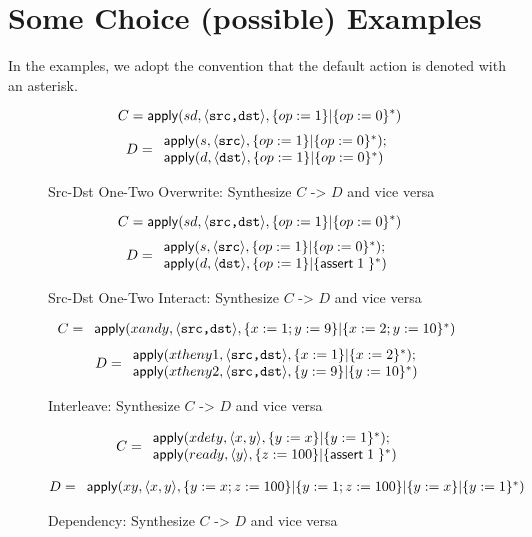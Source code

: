 \section{Some Choice (possible) Examples}

In the examples, we adopt the convention that the default action is
denoted with an asterisk.

\begin{figure}[H]
  \[C = \mathsf{apply}(sd, \langle\texttt{src,dst}\rangle, \{op := 1\} | \{op:=0\}^*)\]
  \[D = \begin{array}{l}
  \mathsf{apply}(s, \langle\texttt{src}\rangle, \{op:=1\} | \{op:=0\}^*);
  \\ \mathsf{apply}(d, \langle\texttt{dst}\rangle, \{op:=1\} | \{op := 0\}^*)
  \end{array}\]
  \caption{Src-Dst One-Two Overwrite: Synthesize $C$ -> $D$ and vice versa}
\end{figure}

\begin{figure}[H]
  \[C = \mathsf{apply}(sd, \langle\texttt{src,dst}\rangle, \{op := 1\} | \{op:=0\}^*)\]
  \[D = \begin{array}{l}
    \mathsf{apply}(s, \langle\texttt{src}\rangle, \{op:=1\} | \{op:=0\}^*);
    \\ \mathsf{apply}(d, \langle\texttt{dst}\rangle, \{op:=1\} | \{\mathsf{assert}\; 1\;\}^*)
  \end{array}\]
  \caption{Src-Dst One-Two Interact: Synthesize $C$ -> $D$ and vice versa}
\end{figure}

\begin{figure}[H]
  \[C = \begin{array}l
    \apply{xandy, \langle\texttt{src,dst}\rangle, \{x := 1; y:= 9\} | \{x:= 2; y:=10\}^*} \\
  \end{array}
  \]
  \[D = \begin{array}{l}
    \mathsf{apply}(xtheny1, \langle\texttt{src,dst}\rangle, \{x:=1\} | \{x:=2\}^*);
    \\ \mathsf{apply}(xtheny2, \langle\texttt{src,dst}\rangle, \{y:=9\} | \{y:=10\}^*)
  \end{array}\]
  \caption{Interleave: Synthesize $C$ -> $D$ and vice versa}
\end{figure}


\begin{figure}[H]
  \[C = \begin{array}l
    \apply{xdety, \langle x,y \rangle, \{y:=x\} | \{y:= 1\}^*}; \\
    \apply{ready, \langle y \rangle, \{z := 100\} | \{\assert \TRUE\}^*}
  \end{array}\]

  \[D = \begin{array}l
    \apply{xy, \langle x, y \rangle, \{y:= x;z:= 100\} | \{y:=1; z:=100\} | \{y:= x\} | \{y:=1\}^*}
    \end{array}\]
  
  \caption{Dependency: Synthesize $C$ -> $D$ and vice versa}
\end{figure}

